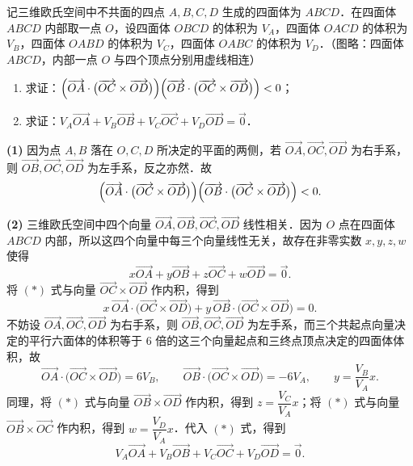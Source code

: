 
记三维欧氏空间中不共面的四点 $A,B,C,D$ 生成的四面体为 $ABCD$．在四面体 $ABCD$ 内部取一点 $O$，设四面体 $OBCD$ 的体积为 $V_A$，四面体 $OACD$ 的体积为 $V_B$，四面体 $OABD$ 的体积为 $V_C$，四面体 $OABC$ 的体积为 $V_D$．（图略：四面体 $ABCD$，内部一点 $O$ 与四个顶点分别用虚线相连）
\begin{enumerate}[label=(\arabic*)]
  \item 求证：$\Bigl(\overrightarrow{OA}\cdot\bigl(\overrightarrow{OC}\times\overrightarrow{OD}\bigr)\Bigr)\Bigl(\overrightarrow{OB}\cdot\bigl(\overrightarrow{OC}\times\overrightarrow{OD}\bigr)\Bigr)<0$；
  \item 求证：$V_A\overrightarrow{OA}+V_B\overrightarrow{OB}+V_C\overrightarrow{OC}+V_D\overrightarrow{OD}=\vec{0}$．
\end{enumerate}
\begin{solution}
\textbf{(1)} 因为点 $A,B$ 落在 $O,C,D$ 所决定的平面的两侧，若 $\overrightarrow{OA},\overrightarrow{OC},\overrightarrow{OD}$ 为右手系，则 $\overrightarrow{OB},\overrightarrow{OC},\overrightarrow{OD}$ 为左手系，反之亦然．故
\[
\Bigl(\overrightarrow{OA}\cdot\bigl(\overrightarrow{OC}\times\overrightarrow{OD}\bigr)\Bigr)\Bigl(\overrightarrow{OB}\cdot\bigl(\overrightarrow{OC}\times\overrightarrow{OD}\bigr)\Bigr)<0.
\]

\textbf{(2)} 三维欧氏空间中四个向量 $\overrightarrow{OA},\overrightarrow{OB},\overrightarrow{OC},\overrightarrow{OD}$ 线性相关．因为 $O$ 点在四面体 $ABCD$ 内部，所以这四个向量中每三个向量线性无关，故存在非零实数 $x,y,z,w$ 使得
\begin{equation*}
x\overrightarrow{OA}+y\overrightarrow{OB}+z\overrightarrow{OC}+w\overrightarrow{OD}=\vec{0}.\tag{$*$}
\end{equation*}
将 $(*)$ 式与向量 $\overrightarrow{OC}\times\overrightarrow{OD}$ 作内积，得到
\[
x\,\overrightarrow{OA}\cdot\bigl(\overrightarrow{OC}\times\overrightarrow{OD}\bigr)
+y\,\overrightarrow{OB}\cdot\bigl(\overrightarrow{OC}\times\overrightarrow{OD}\bigr)=0.
\]
不妨设 $\overrightarrow{OA},\overrightarrow{OC},\overrightarrow{OD}$ 为右手系，则 $\overrightarrow{OB},\overrightarrow{OC},\overrightarrow{OD}$ 为左手系，而三个共起点向量决定的平行六面体的体积等于 $6$ 倍的这三个向量起点和三终点顶点决定的四面体体积，故
\[
\overrightarrow{OA}\cdot\bigl(\overrightarrow{OC}\times\overrightarrow{OD}\bigr)=6V_B,\qquad
\overrightarrow{OB}\cdot\bigl(\overrightarrow{OC}\times\overrightarrow{OD}\bigr)=-6V_A,\qquad
y=\frac{V_B}{V_A}x.
\]
同理，将 $(*)$ 式与向量 $\overrightarrow{OB}\times\overrightarrow{OD}$ 作内积，得到 $z=\dfrac{V_C}{V_A}x$；将 $(*)$ 式与向量 $\overrightarrow{OB}\times\overrightarrow{OC}$ 作内积，得到 $w=\dfrac{V_D}{V_A}x$．代入 $(*)$ 式，得到
\[
V_A\overrightarrow{OA}+V_B\overrightarrow{OB}+V_C\overrightarrow{OC}+V_D\overrightarrow{OD}=\vec{0}.
\]
\end{solution}

